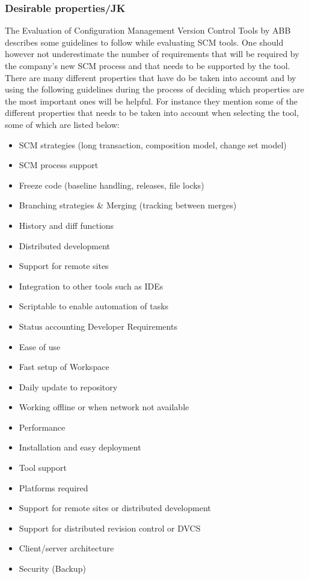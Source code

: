 \documentclass[10pt]{article}
\begin{document}
\subsubsection{Desirable properties/JK}
The Evaluation of Configuration Management Version Control Tools by ABB describes some guidelines to follow while evaluating SCM tools.
One should however not underestimate the number of requirements that will be required by the company's new SCM process and that needs to be supported by the tool.
There are many different properties that have do be taken into account and by using the following guidelines during the process of deciding which properties are the most important ones will be helpful. For instance they mention some of the different properties that needs to be taken into account when selecting the tool, some of which are listed below:
\begin{itemize}
\item SCM strategies (long transaction, composition model, change set model)
\item SCM process support
\item Freeze code (baseline handling, releases, file locks)
\item Branching strategies \& Merging (tracking between merges)
\item History and diff functions
\item Distributed development
\item Support for remote sites
\item Integration to other tools such as IDEs
\item Scriptable to enable automation of tasks
\item Status accounting Developer Requirements
\item Ease of use
\item Fast setup of Workspace
\item Daily update to repository
\item Working offline or when network not available
\item Performance
\item Installation and easy deployment
\item Tool support
\item Platforms required
\item Support for remote sites or distributed development
\item Support for distributed revision control or DVCS
\item Client/server architecture
\item Security (Backup)
\end{itemize}
\end{document}
